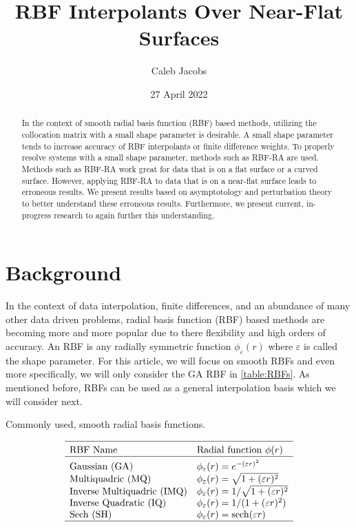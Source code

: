 \documentclass[a4paper,11pt]{article}
\title{RBF Interpolants Over Near-Flat Surfaces}
\author{Caleb Jacobs}
\date{27 April 2022}
\DeclareMathOperator{\sech}{sech}
\newcommand{\eps}{\varepsilon}
\begin{document}
\maketitle
\thispagestyle{empty}

\begin{abstract}
	\noindent
	In the context of smooth radial basis function (RBF) based methods, utilizing the collocation matrix with a small shape parameter is desirable. A small shape parameter tends to increase accuracy of RBF interpolants or finite difference weights. To properly resolve systems with a small shape parameter, methods such as RBF-RA are used. Methods such as RBF-RA work great for data that is on a flat surface or a curved surface. However, applying RBF-RA to data that is on a near-flat surface leads to erroneous results. We present results based on asymptotology and perturbation theory to better understand these erroneous results. Furthermore, we present current, in-progress research to again further this understanding.
\end{abstract}

\section{Background}
In the context of data interpolation, finite differences, and an abundance of many other data driven problems, radial basis function (RBF) based methods are becoming more and more popular due to there flexibility and high orders of accuracy. An RBF is any radially symmetric function $ \phi_\eps(r) $ where $ \eps $ is called the shape parameter. For this article, we will focus on smooth RBFs and even more specifically, we will only consider the GA RBF in \autoref{table:RBFs}. As mentioned before, RBFs can be used as a general interpolation basis which we will consider next.

\begin{table}[t]
	\captionsetup{width = 0.57\linewidth}
	\caption{Commonly used, smooth radial basis functions.}
	\[
	\begin{array}{ll}
		\hline \\[-2ex]
		\text{RBF Name} & \text{Radial function } \phi(r) \\
		\hline \\[-2ex]
		\text{Gaussian (GA)} & \phi_\eps(r) = e^{-(\eps r)^2} \\
		\text{Multiquadric (MQ)} & \phi_\eps(r) = \sqrt{1 + (\eps r)^2} \\
		\text{Inverse Multiquadric (IMQ)} & \phi_\eps(r) = 1 / \sqrt{1 + (\eps r)^2} \\
		\text{Inverse Quadratic (IQ)} & \phi_\eps(r) = 1 / (1 + (\eps r)^2) \\
		\text{Sech (SH)} & \phi_\eps(r) = \sech(\eps r) \\
		\hline
	\end{array}
	\]
	\label{table:RBFs}
\end{table}
\end{document}
